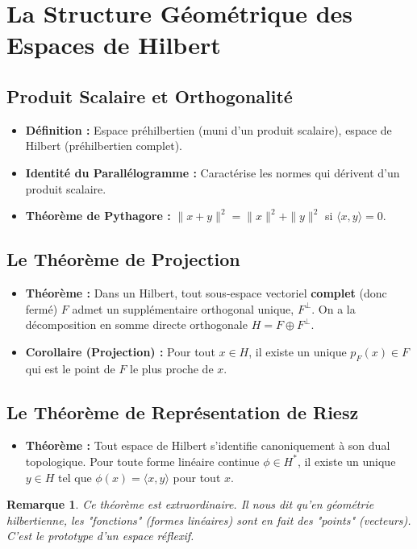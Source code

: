 \documentclass[12pt, a4paper, parskip=full]{report}
\theoremstyle{agregstyle}
\newtheorem{remark}[definition]{Remarque}
\begin{document}
\section{La Structure Géométrique des Espaces de Hilbert}

\subsection{Produit Scalaire et Orthogonalité}
\begin{itemize}
    \item \textbf{Définition :} Espace préhilbertien (muni d'un produit scalaire), espace de Hilbert (préhilbertien complet).
    \item \textbf{Identité du Parallélogramme :} Caractérise les normes qui dérivent d'un produit scalaire.
    \item \textbf{Théorème de Pythagore :} $\|x+y\|^2 = \|x\|^2 + \|y\|^2$ si $\langle x,y \rangle = 0$.
\end{itemize}

\subsection{Le Théorème de Projection}
\begin{itemize}
    \item \textbf{Théorème :} Dans un Hilbert, tout sous-espace vectoriel \textbf{complet} (donc fermé) $F$ admet un supplémentaire orthogonal unique, $F^\perp$. On a la décomposition en somme directe orthogonale $H = F \oplus F^\perp$.
    \item \textbf{Corollaire (Projection) :} Pour tout $x \in H$, il existe un unique $p_F(x) \in F$ qui est le point de $F$ le plus proche de $x$.
\end{itemize}

\subsection{Le Théorème de Représentation de Riesz}
\begin{itemize}
    \item \textbf{Théorème :} Tout espace de Hilbert s'identifie canoniquement à son dual topologique. Pour toute forme linéaire continue $\phi \in H^*$, il existe un unique $y \in H$ tel que $\phi(x) = \langle x, y \rangle$ pour tout $x$.
\end{itemize}
\begin{remark}
    Ce théorème est extraordinaire. Il nous dit qu'en géométrie hilbertienne, les "fonctions" (formes linéaires) sont en fait des "points" (vecteurs). C'est le prototype d'un espace réflexif.
\end{remark}
\end{document}
